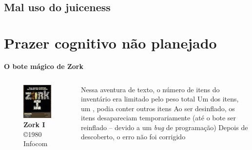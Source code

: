 \expandafter\documentclass\expandafter[table, usenames, svgnames, dvipsnames, \classopts]{beamer}
\begin{document}
\subsection{Mal uso do juiceness}




\section{Prazer cognitivo não planejado}

\begin{frame}{\textbf{O bote mágico de Zork}}

\begin{columns}[c]  
\begin{figure}
\centering
\includegraphics[height=0.5\paperheight]{zork}
\caption{\tiny \textbf{Zork I} \copyright{1980} Infocom\footnotemark{}}
\end{figure}
\begin{outline}
\1 Nessa aventura de texto, o número de itens do inventário era limitado pelo peso total
\1 Um dos itens, um \textit{}, podia conter outros itens
\1 Ao ser desinflado, os itens desapareciam temporariamente (até o bote ser reinflado -- devido a um \textit{bug} de programação)
\1 Depois de descoberto, o erro não foi corrigido
\end{outline}

\end{columns}
\end{frame}
\end{document}
